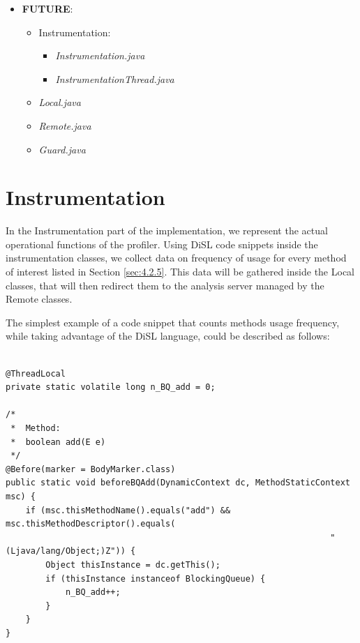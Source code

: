 \documentclass[]{usiinfthesis}
\begin{document}
\begin{itemize}
    \item \textbf{FUTURE}:
    \begin{itemize}
        \item Instrumentation:
        \begin{itemize}
            \item \textit{Instrumentation.java}
            \item \textit{InstrumentationThread.java}
        \end{itemize}
        \item \textit{Local.java}
        \item \textit{Remote.java}
        \item \textit{Guard.java}
    \end{itemize}
\end{itemize}


\large
\section{Instrumentation} \label{sec:5.3}
In the Instrumentation part of the implementation, we represent the actual operational functions of the profiler. Using DiSL code snippets inside the instrumentation classes, we collect data on frequency of usage for every method of interest listed in Section \ref{sec:4.2.5}. This data will be gathered inside the Local classes, that will then redirect them to the analysis server managed by the Remote classes.

\noindent The simplest example of a code snippet that counts methods usage frequency, while taking advantage of the DiSL language, could be described as follows:

\vspace*{0.5cm}
\begin{verbatim}

@ThreadLocal
private static volatile long n_BQ_add = 0;

/*
 *  Method:
 *  boolean add(E e)
 */
@Before(marker = BodyMarker.class)
public static void beforeBQAdd(DynamicContext dc, MethodStaticContext msc) {
    if (msc.thisMethodName().equals("add") && msc.thisMethodDescriptor().equals(
                                                                 "(Ljava/lang/Object;)Z")) {
        Object thisInstance = dc.getThis();
        if (thisInstance instanceof BlockingQueue) {
            n_BQ_add++;
        }
    }
}
\end{verbatim}
\vspace*{0.5cm}
\end{document}
